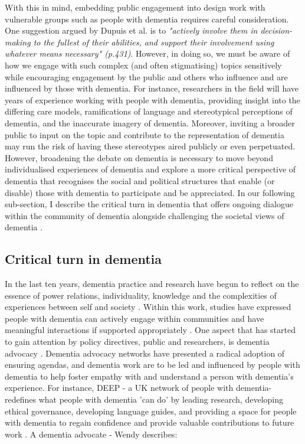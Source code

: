 With this in mind, embedding public engagement into design work with vulnerable groups such as people with dementia requires careful consideration. One suggestion argued by Dupuis et al. is to \textit{"actively involve them in decision-making to the fullest of their abilities, and support their involvement using whatever means necessary" \citep{dupuis_moving_2012} (p.431)}. However, in doing so, we must be aware of how we engage with such complex (and often stigmatising) topics sensitively while encouraging engagement by the public and others who influence and are influenced by those with dementia.  For instance, researchers in the field will have years of experience working with people with dementia, providing insight into the differing care models, ramifications of language and stereotypical perceptions of dementia, and the inaccurate imagery of dementia. Moreover, inviting a broader public to input on the topic and contribute to the representation of dementia may run the risk of having these stereotypes aired publicly or even perpetuated. However, broadening the debate on dementia is necessary to move beyond individualised experiences of dementia and explore a more critical perspective of dementia that recognises the social and political structures that enable (or disable) those with dementia to participate and be appreciated. In our following sub-section, I describe the critical turn in dementia that offers ongoing dialogue within the community of dementia alongside challenging the societal views of dementia \citep{lazar_critical_2017}.

\subsection{Critical turn in dementia}
\label{BL:CriticalTurn}
In the last ten years, dementia practice and research have begun to reflect on the essence of power relations, individuality, knowledge and the complexities of experiences between self and society \citep{bartlett_personhood_2007}. Within this work, studies have expressed people with dementia can actively engage within communities and have meaningful interactions if supported appropriately \citep{mockford2017development}. One aspect that has started to gain attention by policy directives, public and researchers, is dementia advocacy \citep{weetch_involvement_2020}. Dementia advocacy networks have presented a radical adoption of ensuring agendas, and dementia work are to be led and influenced by people with dementia to help foster empathy with and understand a person with dementia's experience.  For instance, DEEP - a UK network of people with dementia- redefines what people with dementia 'can do' by leading research, developing ethical governance, developing language guides, and providing a space for people with dementia to regain confidence and provide valuable contributions to future work \citep{diaries_deep_2020}. A dementia advocate - Wendy describes: 

